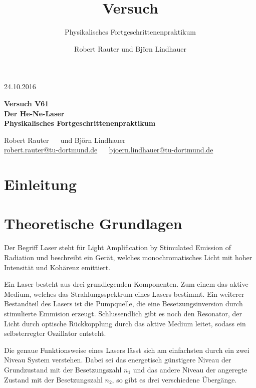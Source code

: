 \documentclass[captions=tableheading]{scrartcl}
\title{Versuch \versuchnummer\\ \versuchname}
\subtitle{Physikalisches Fortgeschrittenenpraktikum}
\author{Robert Rauter und Björn Lindhauer}
\date{\versuchdatum}
\newcommand{\versuchnummer}{V61}
\newcommand{\versuchname}{Der He-Ne-Laser}
\newcommand{\versuchdatum}{24.10.2016}
\begin{document}
\begin{titlepage}
{\large \versuchdatum}
\vspace{7cm}
\begin{center}
\textbf{\huge Versuch \versuchnummer}\\\vspace{0.5cm}
\textbf{\huge \versuchname}\\
\vspace{0.2cm}
\textbf{ Physikalisches Fortgeschrittenenpraktikum}\\
\vspace{9cm}

{\Large Robert Rauter \ \ \hspace{1.5cm} und \hspace{1.5cm} Björn Lindhauer}\\
{ \url{robert.rauter@tu-dortmund.de} \ \ \hspace{2cm} \url{bjoern.lindhauer@tu-dortmund.de}}
\end{center}
\end{titlepage}
\section{Einleitung}

\section{Theoretische Grundlagen}
Der Begriff Laser steht für Light Amplification by Stimulated Emission of Radiation und beschreibt ein Gerät, welches monochromatisches Licht mit hoher Intensität und Kohärenz emittiert.

Ein Laser besteht aus drei grundlegenden Komponenten. Zum einem das aktive Medium, welches das Strahlungsspektrum eines Lasers bestimmt.
Ein weiterer Bestandteil des Lasers ist die Pumpquelle, die eine Besetzungsinversion durch stimulierte Emmision erzeugt. 
Schlussendlich gibt es noch den Resonator, der Licht durch optische Rückkopplung durch das aktive Medium leitet, sodass ein selbsterregter Oszillator entsteht.

Die genaue Funktionsweise eines Lasers lässt sich am einfachsten durch ein zwei Niveau System verstehen. 
Dabei sei das energetisch günstigere Niveau der Grundzustand mit der Besetzungszahl $n_1$ und das andere Niveau der angeregte Zustand mit der Besetzungszahl $n_2$, so gibt es drei verschiedene Übergänge.
\end{document}
